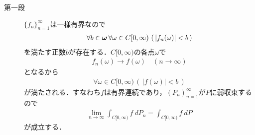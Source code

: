 	\begin{sketch}\mbox{}
		\begin{description}
			\item[第一段]
				$\{f_n\}_{n=1}^\infty$は一様有界なので
				\begin{align}
					\forall b \in {\boldsymbol \omega}\, \forall \omega \in C[0,\infty)\,
					\left(\, |f_n(\omega)| < b\, \right)
				\end{align}
				を満たす正数$b$が存在する．$C[0,\infty)$の各点$\omega$で
				\begin{align}
					f_n(\omega) \longrightarrow f(\omega)\quad (n \longrightarrow \infty)
				\end{align}
				となるから
				\begin{align}
					\forall \omega \in C[0,\infty)\, (\, |f(\omega)| < b\, )
				\end{align}
				が満たされる．すなわち$f$は有界連続であり，$(P_n)_{n=1}^\infty$が$P$に弱収束するので
				\begin{align}
					\lim_{n \to \infty} \int_{C[0,\infty)} f\ dP_n
					= \int_{C[0,\infty)} f\ dP
				\end{align}
				が成立する．
				

\end{description}
\end{sketch}
